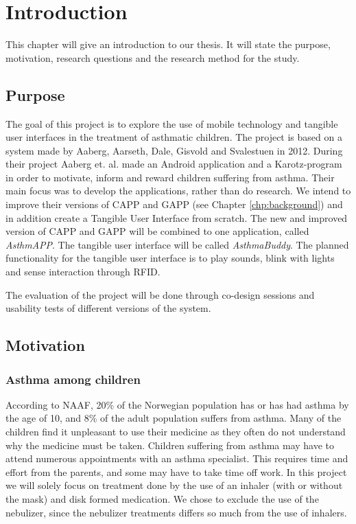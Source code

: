 \chapter{Introduction}
\label{chp:introduction}

This chapter will give an introduction to our thesis. It will state the purpose, motivation, research questions and the research method for the study. 

\section{Purpose}
\label{sec:purpose}
The goal of this project is to explore the use of mobile technology and tangible user interfaces in the treatment of asthmatic children. The project is based on a system made by Aaberg, Aarseth, Dale, Gisvold and Svalestuen in 2012\cite{CustomerDriven}. During their project Aaberg et. al. made an Android application and a Karotz-program in order to motivate, inform and reward children suffering from asthma. Their main focus was to develop the applications, rather than do research.
We intend to improve their versions of CAPP and GAPP (see Chapter \ref{chp:background}) and in addition create a Tangible User Interface from scratch. The new and improved version of CAPP and GAPP will be combined to one application, called \emph{AsthmAPP}. The tangible user interface will be called \emph{AsthmaBuddy}. The planned functionality for the tangible user interface is to play sounds, blink with lights and sense interaction through RFID. 

The evaluation of the project will be done through co-design sessions and usability tests of different versions of the system. 
 

\section{Motivation}
\label{sec:motivation}
\subsection{Asthma among children}
According to NAAF, 20\% of the Norwegian population has or has had asthma by the age of 10, and 8\% of the adult population suffers from asthma\cite{NAAF}. Many of the children find it unpleasant to use their medicine as they often do not understand why the medicine must be taken. Children suffering from asthma may have to attend numerous appointments with an asthma specialist. This requires time and effort from the parents, and some may have to take time off work. In this project we will solely focus on treatment done by the use of an inhaler (with or without the mask) and disk formed medication. We chose to exclude the use of the nebulizer, since the nebulizer treatments differs so much from the use of inhalers.


